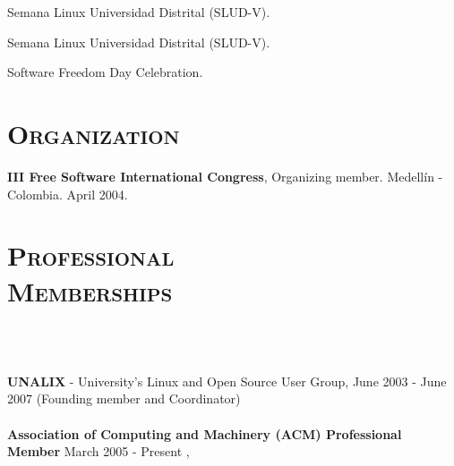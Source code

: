 \begin{resume}
\begin{formatb}
  \\
  \\
   \body
\end{formatb}

\begin{position}
Semana Linux Universidad Distrital (SLUD-V).
\end{position}

\begin{position}
Semana Linux Universidad Distrital (SLUD-V).
\end{position}

\begin{position}
Software Freedom Day Celebration.
\end{position}
\newline     
\newline     
\newline     
\newline     


\section{\textsc{Organization}}
\employer{\textbf{}}
\dates{}
\textbf{III Free Software International Congress}, Organizing member. Medell\'{i}n - Colombia. April 2004.

\section{\textsc{Professional\\ Memberships}}

\begin{formatb}
  \\
  \body\\
\end{formatb}
\employer{}
   {\textbf{UNALIX} - University's Linux and Open Source User Group,
     June 2003 - June 2007 (Founding member and Coordinator)\\ \\
    \textbf{Association of Computing and Machinery (ACM) Professional 
      Member} March 2005 - Present , 
 

}
\end{resume}
